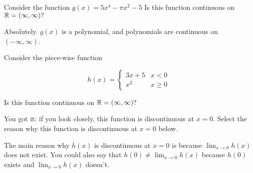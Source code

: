 \documentclass[handout]{ximera}
\begin{document}
\begin{exercise}

Consider the function $g(x) = 5x^4 - \pi x^2 - 5$  Is this function continuous on $\mathbb R = (\infty, \infty)?$  

\begin{multipleChoice}
\end{multipleChoice}

\begin{feedback}[correct]

Absolutely.  $g(x)$ is a polynomial, and polynomials are continuous on $(-\infty, \infty)$.

\end{feedback}

\end{exercise}

\begin{exercise}
Consider the piece-wise function 

\[
h(x) = \begin{cases}
  3x+5  & x<0 \\
  x^2 & x \geq 0
\end{cases}
\]

Is this function continuous on $\mathbb R = (\infty, \infty)?$  

\begin{multipleChoice}
\end{multipleChoice}

\begin{exercise}

You got it: if you look closely, this function is discontinuous at $x=0$.  Select the reason why this function is discontinuous at $x=0$ below.  

\begin{multipleChoice}
    
\begin{feedback}[correct]
The main reason why $h(x)$ is discontinuous at $x=0$ is because $\displaystyle\lim_{x \to 0} h(x)$ does not exist.  You could also say that $h(0) \neq \displaystyle\lim_{x \to 0} h(x)$ because $h(0)$ exists and $\displaystyle\lim_{x \to 0} h(x)$ doesn't.
\end{feedback}

\end{multipleChoice}
\end{exercise}
\end{exercise}
\end{document}
